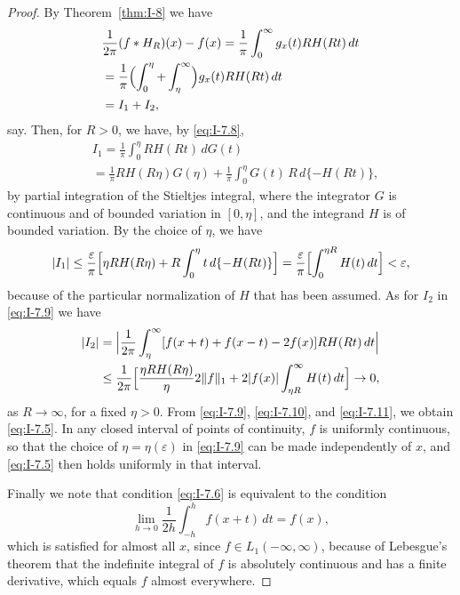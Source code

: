 \begin{proof}
By Theorem~\ref{thm:I-8} we have
\begin{equation}\label{eq:I-7.9}
\begin{aligned}
&\frac{1}{2\pi}(f*H_R)(x)-f(x) = \frac{1}{\pi}\int_0^\infty g_x(t)RH(Rt)\,dt\\
&= \frac{1}{\pi}\Bigl(\int_0^\eta+\int_\eta^\infty\Bigr)g_x(t)RH(Rt)\,dt\\
&= I_1+I_2,
\end{aligned}
\end{equation}
say. Then, for $R>0$, we have, by \eqref{eq:I-7.8},
\begin{equation*}
\begin{aligned}
&I_1 = \frac{1}{\pi}  \int_0^\eta RH(Rt)\,dG(t)\\
&= \frac{1}{\pi}RH(R\eta)G(\eta) + \frac{1}{\pi}  \int_0^\eta G(t)\,R\,d\{-H(Rt)\},
\end{aligned}
\end{equation*}
by partial integration of the Stieltjes integral, where the integrator $G$ is continuous and of bounded variation in $[0,\eta]$, and the integrand $H$ is of bounded variation. By the choice of $\eta$, we have
\begin{equation}\label{eq:I-7.10}
|I_1|\le\frac{\varepsilon}{\pi}\Bigl[\eta RH(R\eta)+R\int_0^\eta t\,d\{-H(Rt)\}\Bigr]
=\frac{\varepsilon}{\pi}\Bigl[\int_0^{\eta R}H(t)\,dt\Bigr]<\varepsilon,
\end{equation}
because of the particular normalization of $H$ that has been assumed. As for $I_2$ in \eqref{eq:I-7.9} we have
\begin{equation}\label{eq:I-7.11}
\begin{aligned}
|I_2| &= \Bigl|\frac{1}{2\pi}\int_\eta^\infty[f(x+t)+f(x-t)-2f(x)]RH(Rt)\,dt\Bigr|\\
&\le \frac{1}{2\pi}\Bigl[\frac{\eta RH(R\eta)}{\eta}2\|f\|_1+2|f(x)|\int_{\eta R}^\infty H(t)\,dt\Bigr]\to 0,
\end{aligned}
\end{equation}
as $R\to\infty$, for a fixed $\eta>0$. From \eqref{eq:I-7.9}, \eqref{eq:I-7.10}, and \eqref{eq:I-7.11}, we obtain \eqref{eq:I-7.5}. In any closed interval of points of continuity, $f$ is uniformly continuous, so that the choice of $\eta=\eta(\varepsilon)$ in \eqref{eq:I-7.9} can be made independently of $x$, and \eqref{eq:I-7.5} then holds uniformly in that interval.

Finally we note that condition \eqref{eq:I-7.6} is equivalent to the condition
\begin{equation*}
\lim_{h\to 0}\frac{1}{2h}\int_{-h}^{h}f(x+t)\,dt=f(x),
\end{equation*}
which is satisfied for almost all $x$, since $f\in L_1(-\infty,\infty)$, because of Lebesgue's theorem that the indefinite integral of $f$ is absolutely continuous and has a finite derivative, which equals $f$ almost everywhere.
\end{proof}

